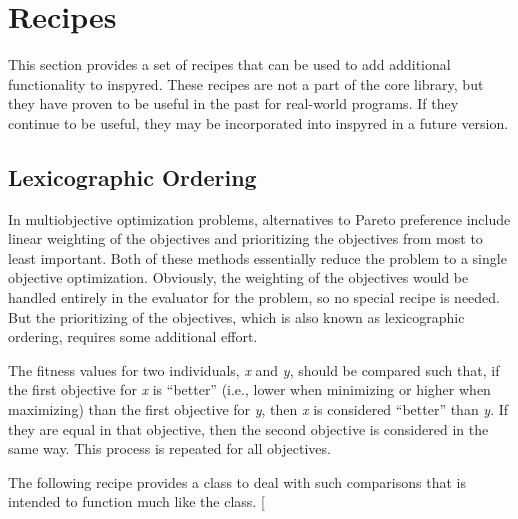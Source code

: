 \documentclass[letterpaper,10pt,english]{sphinxmanual}
\begin{document}
\chapter{Recipes}
\label{recipes:recipes}\label{recipes::doc}
This section provides a set of recipes that can be used to add additional functionality to inspyred.
These recipes are not a part of the core library, but they have proven to be useful in the past for
real-world programs. If they continue to be useful, they may be incorporated into inspyred in a
future version.


\section{Lexicographic Ordering}
\label{recipes:lexicographic-ordering}
In multiobjective optimization problems, alternatives to Pareto preference include linear weighting of the
objectives and prioritizing the objectives from most to least important. Both of these methods essentially
reduce the problem to a single objective optimization. Obviously, the weighting of the objectives would be
handled entirely in the evaluator for the problem, so no special recipe is needed. But the prioritizing
of the objectives, which is also known as lexicographic ordering, requires some additional effort.

The fitness values for two individuals, \emph{x} and \emph{y}, should be compared such that, if the first objective
for \emph{x} is ``better'' (i.e., lower when minimizing or higher when maximizing) than the first objective for
\emph{y}, then \emph{x} is considered ``better'' than \emph{y}. If they are equal in that objective, then the second
objective is considered in the same way. This process is repeated for all objectives.

The following recipe provides a class to deal with such comparisons that is intended to function much like
the  class.
{[}\code{download}{]}
\end{document}
